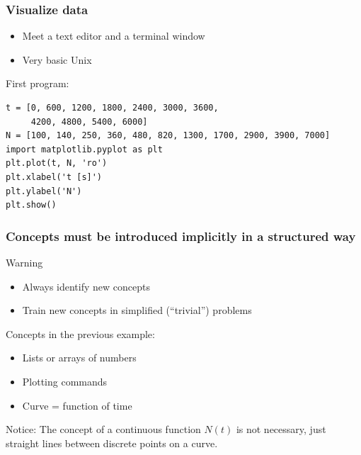 \documentclass{beamer}
\begin{document}
\begin{frame}
\frametitle{Visualize data}

\begin{block}{}
\begin{itemize}
 \item Meet a text editor and a terminal window

 \item Very basic Unix
\end{itemize}

\noindent
First program:

\begin{verbatim}
t = [0, 600, 1200, 1800, 2400, 3000, 3600,
     4200, 4800, 5400, 6000]
N = [100, 140, 250, 360, 480, 820, 1300, 1700, 2900, 3900, 7000]
import matplotlib.pyplot as plt
plt.plot(t, N, 'ro')
plt.xlabel('t [s]')
plt.ylabel('N')
plt.show()
\end{verbatim}
\end{block}
\end{frame}

\begin{frame}
\frametitle{Concepts must be introduced implicitly in a structured way}

\begin{block}{Warning}
\begin{itemize}
 \item Always identify new concepts

 \item Train new concepts in simplified (``trivial'') problems
\end{itemize}

\noindent
\end{block}

\begin{block}{Concepts in the previous example: }
\begin{itemize}
 \item Lists or arrays of numbers

 \item Plotting commands

 \item Curve = function of time
\end{itemize}

\noindent
\end{block}

\begin{block}{Notice: }
The concept of a continuous function $N(t)$ is not necessary,
just straight lines between discrete points on a curve.
\end{block}
\end{frame}
\end{document}
